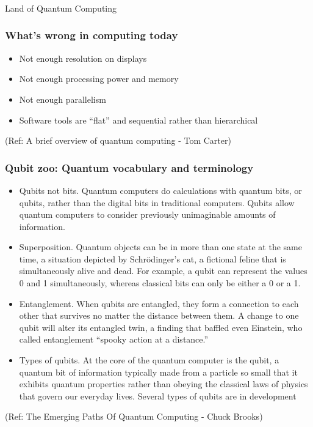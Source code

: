 \begin{frame}[fragile]\frametitle{}
\begin{center}
{\Large Land of Quantum Computing}
\end{center}
\end{frame}

 \begin{frame}[fragile]\frametitle{What's wrong in computing today}
\begin{itemize}
	\item Not enough resolution on displays
	\item Not enough processing power and memory
	\item Not enough parallelism
	\item Software tools are ``flat'' and sequential \newline
		rather than hierarchical
\end{itemize}
	
\tiny{(Ref: A brief overview of quantum computing - Tom Carter)}

\end{frame}



 \begin{frame}[fragile]\frametitle{Qubit zoo: Quantum vocabulary and terminology}
\begin{itemize}
\item  Qubits not bits. Quantum computers do calculations with quantum bits, or qubits, rather than the digital bits in traditional computers. Qubits allow quantum computers to consider previously unimaginable amounts of information.

\item  Superposition. Quantum objects can be in more than one state at the same time, a situation depicted by Schrödinger’s cat, a fictional feline that is simultaneously alive and dead. For example, a qubit can represent the values 0 and 1 simultaneously, whereas classical bits can only be either a 0 or a 1.

\item  Entanglement. When qubits are entangled, they form a connection to each other that survives no matter the distance between them. A change to one qubit will alter its entangled twin, a finding that baffled even Einstein, who called entanglement “spooky action at a distance.”

\item  Types of qubits. At the core of the quantum computer is the qubit, a quantum bit of information typically made from a particle so small that it exhibits quantum properties rather than obeying the classical laws of physics that govern our everyday lives. Several types of qubits are in development
\end{itemize}

	
\tiny{(Ref: The Emerging Paths Of Quantum Computing - Chuck Brooks)}

\end{frame}

